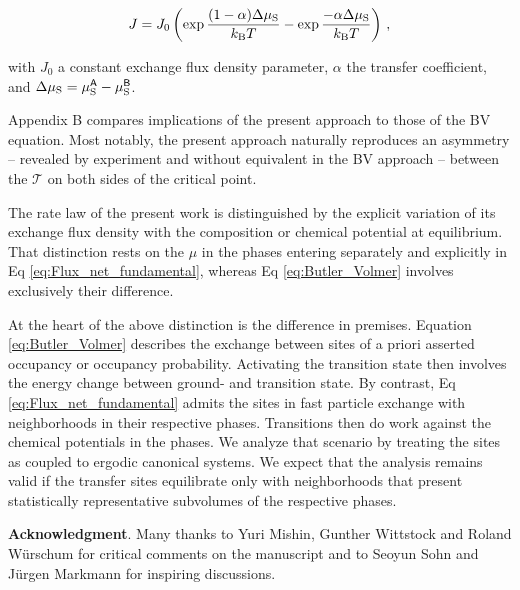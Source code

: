 \documentclass[english,aps,prb,showkeys,reprint]{revtex4-2}
\newcommand{\be}{\begin{equation}}
\newcommand{\ee}{\end{equation}}
\begin{document}
\be
\label{eq:Butler_Volmer}
J
=
J_0
\left(
\exp \frac {(1-\alpha) \Delta \mu_{\rm S}}{k_{\rm B} T}
-\exp \frac {- \alpha \Delta \mu_{\rm S}}{k_{\rm B} T}
\right)\, ,
\ee

with $J_0$ a constant exchange flux density parameter, $\alpha$ the transfer coefficient, and $\Delta \mu_{\rm S} = \mu^{\sf A}_{\rm S} - \mu^{\sf B}_{\rm S}$.

Appendix B compares implications of the present approach to those of the BV equation. Most notably, the present approach naturally reproduces an asymmetry -- revealed by experiment \cite{BapariWeissmüller2025} and without equivalent in the BV approach -- between the $\mathcal T$ on both sides of the critical point.

The rate law of the present work is distinguished by the explicit variation of its exchange flux density with the composition or chemical potential at equilibrium. That distinction rests on the $\mu$ in the phases entering separately and explicitly in Eq \ref{eq:Flux_net_fundamental}, whereas Eq \ref{eq:Butler_Volmer} involves exclusively their difference.

At the heart of the above distinction is the difference in premises. Equation \ref{eq:Butler_Volmer} describes the exchange between sites of a priori asserted occupancy or occupancy probability. Activating the transition state then involves the energy change between ground- and transition state. By contrast, Eq \ref{eq:Flux_net_fundamental} admits the sites in fast particle exchange with neighborhoods in their respective phases. Transitions then do work against the chemical potentials in the phases. We analyze that scenario by treating the sites as coupled to ergodic canonical systems. We expect that the analysis remains valid if the transfer sites equilibrate only with neighborhoods that present statistically representative subvolumes of the respective phases.

\textbf{Acknowledgment}. Many thanks to Yuri Mishin, Gunther Wittstock and Roland Würschum for critical comments on the manuscript and to Seoyun Sohn and Jürgen Markmann for inspiring discussions.
\end{document}
